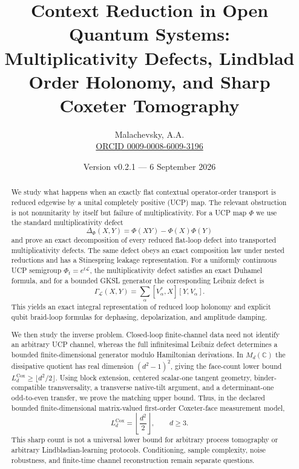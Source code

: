 \documentclass[11pt]{article}
\title{\textbf{Context Reduction in Open Quantum Systems:}\\
Multiplicativity Defects, Lindblad Order Holonomy, and Sharp Coxeter Tomography}
\author{Malachevsky, A.A.\\
\href{https://orcid.org/0009-0008-6009-3196}{ORCID 0009-0008-6009-3196}}
\date{Version v0.2.1 --- 6 September 2026}
\theoremstyle{definition}
\theoremstyle{remark}
\newcommand{\Cox}{\mathrm{Cox}}
\begin{document}
\maketitle

\begin{abstract}
We study what happens when an exactly flat contextual operator-order transport is reduced edgewise by a unital completely positive (UCP) map. The relevant obstruction is not nonunitarity by itself but failure of multiplicativity. For a UCP map $\Phi$ we use the standard multiplicativity defect
\[
\Delta_\Phi(X,Y)=\Phi(XY)-\Phi(X)\Phi(Y)
\]
and prove an exact decomposition of every reduced flat-loop defect into transported multiplicativity defects. The same defect obeys an exact composition law under nested reductions and has a Stinespring leakage representation. For a uniformly continuous UCP semigroup $\Phi_t=e^{t\mathcal L}$, the multiplicativity defect satisfies an exact Duhamel formula, and for a bounded GKSL generator the corresponding Leibniz defect is
\[
\Gamma_{\mathcal L}(X,Y)=\sum_\alpha [V_\alpha^*,X][Y,V_\alpha].
\]
This yields an exact integral representation of reduced loop holonomy and explicit qubit braid-loop formulas for dephasing, depolarization, and amplitude damping.

We then study the inverse problem. Closed-loop finite-channel data need not identify an arbitrary UCP channel, whereas the full infinitesimal Leibniz defect determines a bounded finite-dimensional generator modulo Hamiltonian derivations. In $M_d(\mathbb C)$ the dissipative quotient has real dimension $(d^2-1)^2$, giving the face-count lower bound $L_d^{\Cox}\ge \lfloor d^2/2\rfloor$. Using block extension, centered scalar-one tangent geometry, binder-compatible transversality, a transverse native-tilt argument, and a determinant-one odd-to-even transfer, we prove the matching upper bound. Thus, in the declared bounded finite-dimensional matrix-valued first-order Coxeter-face measurement model,
\[
\boxed{L_d^{\Cox}=\left\lfloor\frac{d^2}{2}\right\rfloor,\qquad d\ge 3.}
\]
This sharp count is not a universal lower bound for arbitrary process tomography or arbitrary Lindbladian-learning protocols. Conditioning, sample complexity, noise robustness, and finite-time channel reconstruction remain separate questions.
\end{abstract}
\end{document}
